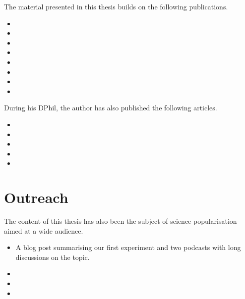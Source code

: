 The material presented in this thesis builds on the following publications.
\begin{itemize}[label={}]
\item {}\vspace{-10pt}
\item {}\vspace{-10pt}
\item {}\vspace{-10pt}
\item {}\vspace{-10pt}
\item {}\vspace{-10pt}
\item {}\vspace{-10pt}
\item {}
\item {}\vspace{5pt}
\end{itemize}\vspace{10pt}
During his DPhil, the author has also published the following articles.
\begin{itemize}[label={}]
\item {}\vspace{-10pt}
\item {}\vspace{-10pt}
\item {}\vspace{5pt}
\item {}\vspace{-10pt}
\item {}\vspace{-10pt}
\end{itemize}

\section*{Outreach}

The content of this thesis has also been the subject of science popularisation aimed at a wide audience.

\begin{itemize}
\item A blog post summarising our first experiment and two podcasts with long discussions on the topic.
\end{itemize}
\begin{itemize}[label={}]
\item {}\vspace{-10pt}
\item {}\vspace{-10pt}
\item {}\vspace{-10pt}
\end{itemize}

